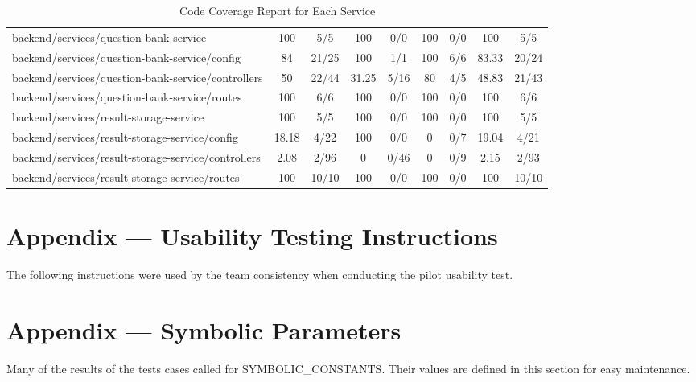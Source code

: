 \documentclass[12pt, titlepage]{article}
\begin{document}
\begin{table}[H]
{\begin{tabular}{@{}lcccccccc@{}}
  backend/services/question-bank-service & 100 & 5/5 & 100 & 0/0 & 100 & 0/0 & 100 & 5/5 \\
  backend/services/question-bank-service/config & 84 & 21/25 & 100 & 1/1 & 100 & 6/6 & 83.33 & 20/24 \\
  backend/services/question-bank-service/controllers & 50 & 22/44 & 31.25 & 5/16 & 80 & 4/5 & 48.83 & 21/43 \\
  backend/services/question-bank-service/routes & 100 & 6/6 & 100 & 0/0 & 100 & 0/0 & 100 & 6/6 \\
  backend/services/result-storage-service & 100 & 5/5 & 100 & 0/0 & 100 & 0/0 & 100 & 5/5 \\
  backend/services/result-storage-service/config & 18.18 & 4/22 & 100 & 0/0 & 0 & 0/7 & 19.04 & 4/21 \\
  backend/services/result-storage-service/controllers & 2.08 & 2/96 & 0 & 0/46 & 0 & 0/9 & 2.15 & 2/93 \\
  backend/services/result-storage-service/routes & 100 & 10/10 & 100 & 0/0 & 100 & 0/0 & 100 & 10/10 \\ 
  \bottomrule
  \end{tabular}
  }
  \caption{Code Coverage Report for Each Service}
  \label{tab:coverage}
  \end{table}

  \newpage{}




\newpage{}

\section{Appendix --- Usability Testing Instructions}
\hspace{2em} The following instructions were used by the team consistency when conducting the pilot usability test.



\newpage{}

\section{Appendix --- Symbolic Parameters}

Many of the results of the tests cases called for SYMBOLIC\_CONSTANTS.
Their values are defined in this section for easy maintenance.
\end{document}
